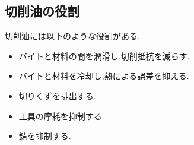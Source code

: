 \subsection{切削油の役割}
切削油には以下のような役割がある.
\begin{itemize}
  \item バイトと材料の間を潤滑し,切削抵抗を減らす.
  \item バイトと材料を冷却し,熱による誤差を抑える.
  \item 切りくずを排出する.
  \item 工具の摩耗を抑制する.
  \item 錆を抑制する.\cite{12}
\end{itemize}